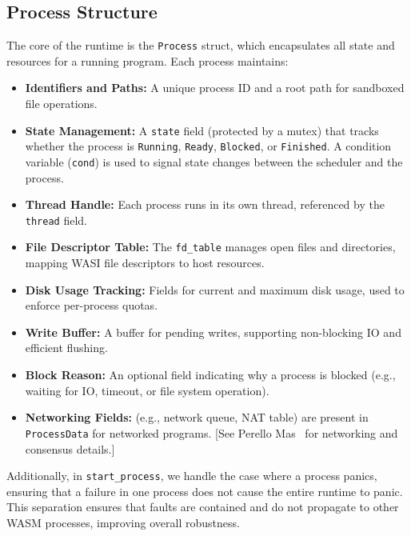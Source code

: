 \documentclass[10pt,a4paper,twocolumn]{IEEEtran}
\begin{document}
\subsection*{Process Structure}
The core of the runtime is the \texttt{Process} struct, which encapsulates all state and resources for a running program. Each process maintains:
\begin{itemize}
    \item \textbf{Identifiers and Paths:} A unique process ID and a root path for sandboxed file operations.
    \item \textbf{State Management:} A \texttt{state} field (protected by a mutex) that tracks whether the process is \texttt{Running}, \texttt{Ready}, \texttt{Blocked}, or \texttt{Finished}. A condition variable (\texttt{cond}) is used to signal state changes between the scheduler and the process.
    \item \textbf{Thread Handle:} Each process runs in its own thread, referenced by the \texttt{thread} field.
    \item \textbf{File Descriptor Table:} The \texttt{fd\_table} manages open files and directories, mapping WASI file descriptors to host resources.
    \item \textbf{Disk Usage Tracking:} Fields for current and maximum disk usage, used to enforce per-process quotas.
    \item \textbf{Write Buffer:} A buffer for pending writes, supporting non-blocking IO and efficient flushing.
    \item \textbf{Block Reason:} An optional field indicating why a process is blocked (e.g., waiting for IO, timeout, or file system operation).
    \item \textbf{Networking Fields:} (e.g., network queue, NAT table) are present in \texttt{ProcessData} for networked programs. [See Perello Mas~\cite{perellomas2025} for networking and consensus details.]
\end{itemize}
Additionally, in \texttt{start\_process}, we handle the case where a process panics, ensuring that a failure in one process does not cause the entire runtime to panic. This separation ensures that faults are contained and do not propagate to other WASM processes, improving overall robustness.
\end{document}
